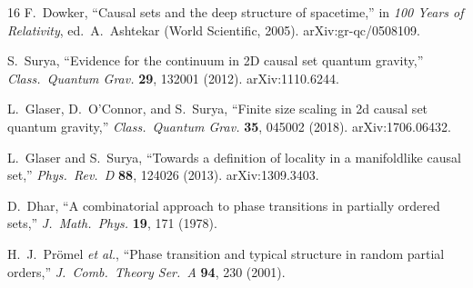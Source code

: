 \documentclass[12pt,a4paper]{article}
\begin{document}
\begin{thebibliography}{16}
F.~Dowker,
``Causal sets and the deep structure of spacetime,''
in \textit{100 Years of Relativity}, ed.\ A.~Ashtekar
(World Scientific, 2005). arXiv:gr-qc/0508109.

S.~Surya,
``Evidence for the continuum in 2D causal set quantum gravity,''
\textit{Class.\ Quantum Grav.} \textbf{29}, 132001 (2012).
arXiv:1110.6244.

L.~Glaser, D.~O'Connor, and S.~Surya,
``Finite size scaling in 2d causal set quantum gravity,''
\textit{Class.\ Quantum Grav.} \textbf{35}, 045002 (2018).
arXiv:1706.06432.

L.~Glaser and S.~Surya,
``Towards a definition of locality in a manifoldlike causal set,''
\textit{Phys.\ Rev.\ D} \textbf{88}, 124026 (2013).
arXiv:1309.3403.

D.~Dhar,
``A combinatorial approach to phase transitions in partially ordered sets,''
\textit{J.\ Math.\ Phys.} \textbf{19}, 171 (1978).

H.~J.~Pr\"omel \textit{et al.},
``Phase transition and typical structure in random partial orders,''
\textit{J.\ Comb.\ Theory Ser.\ A} \textbf{94}, 230 (2001).

\end{thebibliography}
\end{document}
